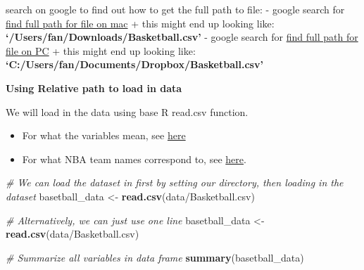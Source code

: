 \documentclass[
]{book}
\newenvironment{Shaded}{\begin{snugshade}}{\end{snugshade}}
\newcommand{\CommentTok}[1]{\textcolor[rgb]{0.56,0.35,0.01}{\textit{#1}}}
\newcommand{\KeywordTok}[1]{\textcolor[rgb]{0.13,0.29,0.53}{\textbf{#1}}}
\newcommand{\NormalTok}[1]{#1}
\newcommand{\StringTok}[1]{\textcolor[rgb]{0.31,0.60,0.02}{#1}}
\providecommand{\tightlist}{%
  \setlength{\itemsep}{0pt}\setlength{\parskip}{0pt}}
\begin{document}
search on google to find out how to get the full path to file:
- google search for \href{https://www.google.com/search?q=find+full+path+for+file+on+mac}{find full path for file on mac}
+ this might end up looking like: \textbf{`/Users/fan/Downloads/Basketball.csv'}
- google search for \href{https://www.google.com/search?q=find+full+path+for+file+on+mac}{find full path for file on PC}
+ this might end up looking like: \textbf{`C:/Users/fan/Documents/Dropbox/Basketball.csv'}

\textbf{Using Relative path to load in data}

We will load in the data using base R read.csv function.

\begin{itemize}
\tightlist
\item
  For what the variables mean, see \href{https://en.wikipedia.org/wiki/Basketball_statistics}{here}
\item
  For what NBA team names correspond to, see \href{https://en.wikipedia.org/w/index.php?title=Wikipedia:WikiProject_National_Basketball_Association/National_Basketball_Association_team_abbreviations}{here}.
\end{itemize}

\begin{Shaded}
\begin{Highlighting}[]
\CommentTok{\# We can load the dataset in first by setting our directory, then loading in the dataset}
\NormalTok{basetball\_data \textless{}{-}}\StringTok{ }\KeywordTok{read.csv}\NormalTok{(}\StringTok{\textquotesingle{}data/Basketball.csv\textquotesingle{}}\NormalTok{)}
\end{Highlighting}
\end{Shaded}

\begin{Shaded}
\begin{Highlighting}[]
\CommentTok{\# Alternatively, we can just use one line}
\NormalTok{basetball\_data \textless{}{-}}\StringTok{ }\KeywordTok{read.csv}\NormalTok{(}\StringTok{\textquotesingle{}data/Basketball.csv\textquotesingle{}}\NormalTok{)}
\end{Highlighting}
\end{Shaded}

\begin{Shaded}
\begin{Highlighting}[]
\CommentTok{\# Summarize all variables in data frame}
\KeywordTok{summary}\NormalTok{(basetball\_data)}
\end{Highlighting}
\end{Shaded}
\end{document}
